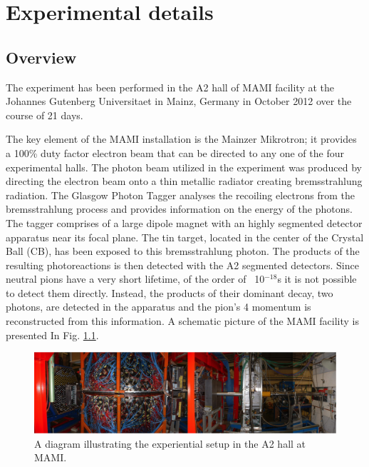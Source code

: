 \setcounter{equation}{0}

\chapter{Experimental details}

\section{Overview}

\indent The experiment has been performed in the A2 hall of MAMI facility at the Johannes Gutenberg Universitaet in Mainz, Germany in October 2012 over the course of 21 days.

\indent The key element of the MAMI installation is the Mainzer Mikrotron; it provides a 100\% duty factor electron beam that can be directed to any one of the four experimental halls. The photon beam utilized in the experiment was produced by directing the electron beam onto a thin metallic radiator creating bremsstrahlung radiation. The Glasgow Photon Tagger analyses the recoiling electrons from the bremsstrahlung process and provides information on the energy of the photons. The tagger comprises of a large dipole magnet with an highly segmented detector apparatus near its focal plane. The tin target, located in the center of the Crystal Ball (CB), has been exposed to this bremsstrahlung photon. The products of the resulting photoreactions is then detected with the A2 segmented detectors. Since neutral pions have a very short lifetime, of the order of ~10$^{-18}$s it is not possible to detect them directly. Instead, the products of their dominant decay, two photons, are detected in the apparatus and the pion's 4 momentum is reconstructed from this information. A schematic picture of the MAMI facility is presented In Fig. \ref{a2hallsetup}.

\begin{figure}[H]
\begin{center}
\includegraphics[scale=0.55]{pictures/png/a2hallsetup.png}
\caption{A diagram illustrating the experiential setup in the A2 hall at MAMI.}
\label{a2hallsetup}
\end{center}
\end{figure}

